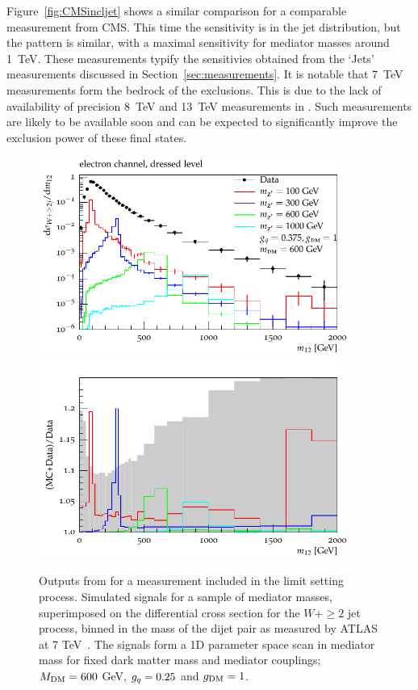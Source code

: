 \documentclass[floatfix]{article}
\begin{document}
Figure~\ref{fig:CMSincljet} shows a similar comparison for a comparable measurement from CMS. This time the sensitivity is in the jet \pt distribution, but the pattern
is similar, with a maximal sensitivity for mediator masses around 1~TeV. These measurements typify the sensitivies obtained from the `Jets' measurements discussed in
Section~\ref{sec:measurements}. It is notable that 7~TeV measurements form the bedrock of the exclusions. This is due to the lack of availability of precision
8~TeV and 13~TeV measurements in \rivet. Such measurements are likely to be available soon and can be expected to significantly improve the exclusion power of these
final states.

\begin{figure}
\centering
      \includegraphics[width=0.9\textwidth]{images/atlaswjet/fullrange/ATLASWjet.pdf}
      \includegraphics[width=0.9\textwidth]{images/atlaswjet/ratio/ATLASwjet_ratio.pdf}
\caption{Outputs from \rivet for a measurement included in the limit setting process. Simulated signals for a sample of mediator masses, superimposed on 
the differential cross section for the $W+\geq2$ jet process, binned in the mass of the dijet pair as measured by ATLAS at 7 TeV~\cite{Aad:2014qxa}.
The signals form a 1D parameter space scan in mediator mass for fixed dark matter mass and mediator couplings; $M_{\rm DM}=600$ GeV, $g_{q}=0.25$ and $g_{\rm DM} = 1$.}
\label{fig:ATLASwjet}
\end{figure}
\end{document}

